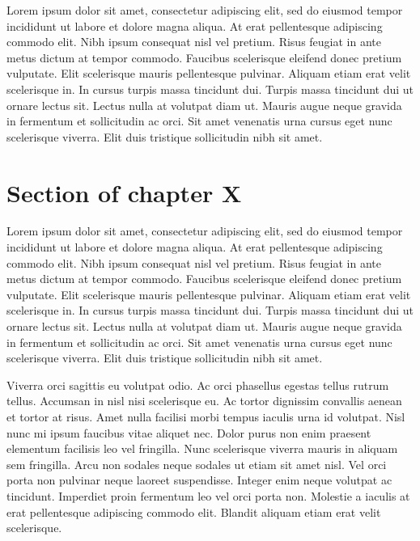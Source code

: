 Lorem ipsum dolor sit amet, consectetur adipiscing elit, sed do eiusmod tempor incididunt ut labore et dolore magna aliqua. At erat pellentesque adipiscing commodo elit. Nibh ipsum consequat nisl vel pretium. Risus feugiat in ante metus dictum at tempor commodo. Faucibus scelerisque eleifend donec pretium vulputate. Elit scelerisque mauris pellentesque pulvinar. Aliquam etiam erat velit scelerisque in. In cursus turpis massa tincidunt dui. Turpis massa tincidunt dui ut ornare lectus sit. Lectus nulla at volutpat diam ut. Mauris augue neque gravida in fermentum et sollicitudin ac orci. Sit amet venenatis urna cursus eget nunc scelerisque viverra. Elit duis tristique sollicitudin nibh sit amet.

\section{Section of chapter X}

Lorem ipsum dolor sit amet, consectetur adipiscing elit, sed do eiusmod tempor incididunt ut labore et dolore magna aliqua. At erat pellentesque adipiscing commodo elit. Nibh ipsum consequat nisl vel pretium. Risus feugiat in ante metus dictum at tempor commodo. Faucibus scelerisque eleifend donec pretium vulputate. Elit scelerisque mauris pellentesque pulvinar. Aliquam etiam erat velit scelerisque in. In cursus turpis massa tincidunt dui. Turpis massa tincidunt dui ut ornare lectus sit. Lectus nulla at volutpat diam ut. Mauris augue neque gravida in fermentum et sollicitudin ac orci. Sit amet venenatis urna cursus eget nunc scelerisque viverra. Elit duis tristique sollicitudin nibh sit amet.

Viverra orci sagittis eu volutpat odio. Ac orci phasellus egestas tellus rutrum tellus. Accumsan in nisl nisi scelerisque eu. Ac tortor dignissim convallis aenean et tortor at risus. Amet nulla facilisi morbi tempus iaculis urna id volutpat. Nisl nunc mi ipsum faucibus vitae aliquet nec. Dolor purus non enim praesent elementum facilisis leo vel fringilla. Nunc scelerisque viverra mauris in aliquam sem fringilla. Arcu non sodales neque sodales ut etiam sit amet nisl. Vel orci porta non pulvinar neque laoreet suspendisse. Integer enim neque volutpat ac tincidunt. Imperdiet proin fermentum leo vel orci porta non. Molestie a iaculis at erat pellentesque adipiscing commodo elit. Blandit aliquam etiam erat velit scelerisque.

